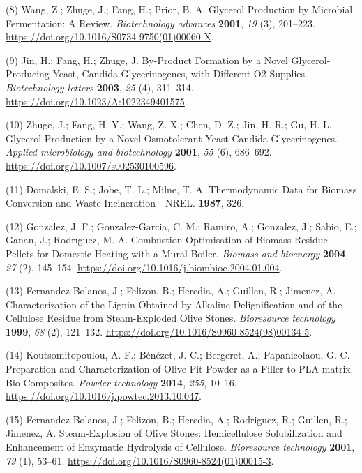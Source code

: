 \documentclass[11pt]{article}
\begin{document}
\hypertarget{citeproc_bib_item_8}{(8) Wang, Z.; Zhuge, J.; Fang, H.; Prior, B. A. Glycerol Production by Microbial Fermentation: A Review. \textit{Biotechnology advances} \textbf{2001}, \textit{19} (3), 201–223. \url{https://doi.org/10.1016/S0734-9750(01)00060-X}.}

\hypertarget{citeproc_bib_item_9}{(9) Jin, H.; Fang, H.; Zhuge, J. By-Product Formation by a Novel Glycerol-Producing Yeast, Candida Glycerinogenes, with Different O2 Supplies. \textit{Biotechnology letters} \textbf{2003}, \textit{25} (4), 311–314. \url{https://doi.org/10.1023/A:1022349401575}.}

\hypertarget{citeproc_bib_item_10}{(10) Zhuge, J.; Fang, H.-Y.; Wang, Z.-X.; Chen, D.-Z.; Jin, H.-R.; Gu, H.-L. Glycerol Production by a Novel Osmotolerant Yeast Candida Glycerinogenes. \textit{Applied microbiology and biotechnology} \textbf{2001}, \textit{55} (6), 686–692. \url{https://doi.org/10.1007/s002530100596}.}

\hypertarget{citeproc_bib_item_11}{(11) Domalski, E. S.; Jobe, T. L.; Milne, T. A. Thermodynamic Data for Biomass Conversion and Waste Incineration - NREL. \textbf{1987}, 326.}

\hypertarget{citeproc_bib_item_12}{(12) Gonzalez, J. F.; Gonzalez-Garcia, C. M.; Ramiro, A.; Gonzalez, J.; Sabio, E.; Ganan, J.; Rodrıguez, M. A. Combustion Optimisation of Biomass Residue Pellets for Domestic Heating with a Mural Boiler. \textit{Biomass and bioenergy} \textbf{2004}, \textit{27} (2), 145–154. \url{https://doi.org/10.1016/j.biombioe.2004.01.004}.}

\hypertarget{citeproc_bib_item_13}{(13) Fernandez-Bolanos, J.; Felizon, B.; Heredia, A.; Guillen, R.; Jimenez, A. Characterization of the Lignin Obtained by Alkaline Delignification and of the Cellulose Residue from Steam-Exploded Olive Stones. \textit{Bioresource technology} \textbf{1999}, \textit{68} (2), 121–132. \url{https://doi.org/10.1016/S0960-8524(98)00134-5}.}

\hypertarget{citeproc_bib_item_14}{(14) Koutsomitopoulou, A. F.; Bénézet, J. C.; Bergeret, A.; Papanicolaou, G. C. Preparation and Characterization of Olive Pit Powder as a Filler to PLA-matrix Bio-Composites. \textit{Powder technology} \textbf{2014}, \textit{255}, 10–16. \url{https://doi.org/10.1016/j.powtec.2013.10.047}.}

\hypertarget{citeproc_bib_item_15}{(15) Fernandez-Bolanos, J.; Felizon, B.; Heredia, A.; Rodriguez, R.; Guillen, R.; Jimenez, A. Steam-Explosion of Olive Stones: Hemicellulose Solubilization and Enhancement of Enzymatic Hydrolysis of Cellulose. \textit{Bioresource technology} \textbf{2001}, \textit{79} (1), 53–61. \url{https://doi.org/10.1016/S0960-8524(01)00015-3}.}
\end{document}
